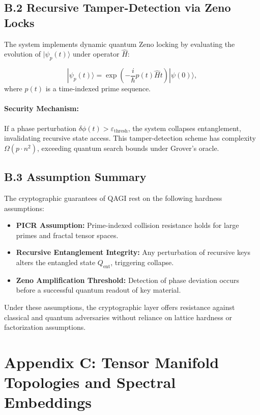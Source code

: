 \subsection*{B.2 Recursive Tamper-Detection via Zeno Locks}

The system implements dynamic quantum Zeno locking by evaluating the evolution of \(|\psi_p(t)\rangle\) under operator \(\hat{H}\):

\[
|\psi_p(t)\rangle = \exp\left(-\frac{i}{\hbar} p(t) \hat{H} t\right) |\psi(0)\rangle,
\]
where \(p(t)\) is a time-indexed prime sequence.

\paragraph{Security Mechanism:}
If a phase perturbation \(\delta \phi(t) > \varepsilon_{\text{thresh}}\), the system collapses entanglement, invalidating recursive state access. This tamper-detection scheme has complexity \(\Omega(p \cdot n^2)\), exceeding quantum search bounds under Grover’s oracle.

\subsection*{B.3 Assumption Summary}

The cryptographic guarantees of QAGI rest on the following hardness assumptions:

\begin{itemize}
    \item \textbf{PICR Assumption:} Prime-indexed collision resistance holds for large primes and fractal tensor spaces.
    \item \textbf{Recursive Entanglement Integrity:} Any perturbation of recursive keys alters the entangled state \(Q_{\text{ent}}\), triggering collapse.
    \item \textbf{Zeno Amplification Threshold:} Detection of phase deviation occurs before a successful quantum readout of key material.
\end{itemize}

Under these assumptions, the cryptographic layer offers resistance against classical and quantum adversaries without reliance on lattice hardness or factorization assumptions.

\section*{Appendix C: Tensor Manifold Topologies and Spectral Embeddings}

